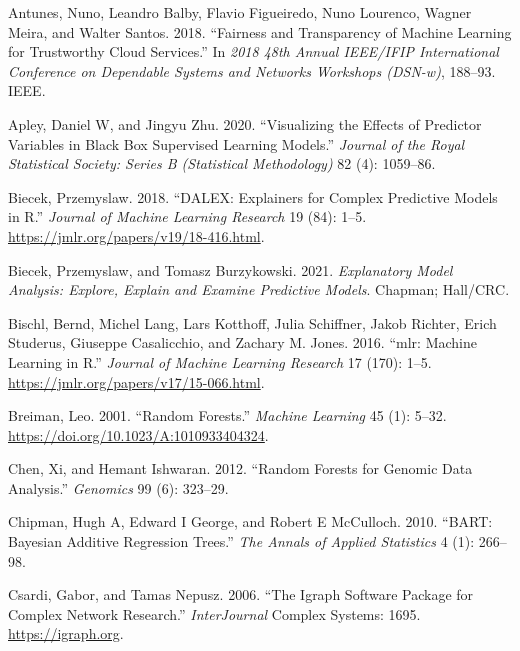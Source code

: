\hypertarget{refs}{}
\begin{CSLReferences}{1}{0}
\leavevmode{}%
Antunes, Nuno, Leandro Balby, Flavio Figueiredo, Nuno Lourenco, Wagner Meira, and Walter Santos. 2018. {``Fairness and Transparency of Machine Learning for Trustworthy Cloud Services.''} In \emph{2018 48th Annual IEEE/IFIP International Conference on Dependable Systems and Networks Workshops (DSN-w)}, 188--93. IEEE.

\leavevmode{}%
Apley, Daniel W, and Jingyu Zhu. 2020. {``Visualizing the Effects of Predictor Variables in Black Box Supervised Learning Models.''} \emph{Journal of the Royal Statistical Society: Series B (Statistical Methodology)} 82 (4): 1059--86.

\leavevmode{}%
Biecek, Przemyslaw. 2018. {``DALEX: Explainers for Complex Predictive Models in {R}.''} \emph{Journal of Machine Learning Research} 19 (84): 1--5. \url{https://jmlr.org/papers/v19/18-416.html}.

\leavevmode{}%
Biecek, Przemyslaw, and Tomasz Burzykowski. 2021. \emph{Explanatory Model Analysis: Explore, Explain and Examine Predictive Models}. Chapman; Hall/CRC.

\leavevmode{}%
Bischl, Bernd, Michel Lang, Lars Kotthoff, Julia Schiffner, Jakob Richter, Erich Studerus, Giuseppe Casalicchio, and Zachary M. Jones. 2016. {``{mlr}: Machine Learning in {R}.''} \emph{Journal of Machine Learning Research} 17 (170): 1--5. \url{https://jmlr.org/papers/v17/15-066.html}.

\leavevmode{}%
Breiman, Leo. 2001. {``Random Forests.''} \emph{Machine Learning} 45 (1): 5--32. \url{https://doi.org/10.1023/A:1010933404324}.

\leavevmode{}%
Chen, Xi, and Hemant Ishwaran. 2012. {``Random Forests for Genomic Data Analysis.''} \emph{Genomics} 99 (6): 323--29.

\leavevmode{}%
Chipman, Hugh A, Edward I George, and Robert E McCulloch. 2010. {``BART: Bayesian Additive Regression Trees.''} \emph{The Annals of Applied Statistics} 4 (1): 266--98.

\leavevmode{}%
Csardi, Gabor, and Tamas Nepusz. 2006. {``The Igraph Software Package for Complex Network Research.''} \emph{InterJournal} Complex Systems: 1695. \url{https://igraph.org}.


\end{CSLReferences}
